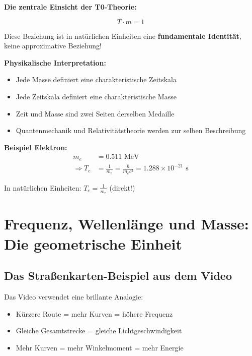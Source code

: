 \documentclass[12pt,a4paper]{article}
\begin{document}
	\begin{vorteil}
		\textbf{Die zentrale Einsicht der T0-Theorie:}
		
		\begin{equation}
			\boxed{T \cdot m = 1}
		\end{equation}
		
		Diese Beziehung ist in natürlichen Einheiten eine \textbf{fundamentale Identität}, keine approximative Beziehung!
		
		\textbf{Physikalische Interpretation:}
		\begin{itemize}
			\item Jede Masse definiert eine charakteristische Zeitskala
			\item Jede Zeitskala definiert eine charakteristische Masse
			\item Zeit und Masse sind zwei Seiten derselben Medaille
			\item Quantenmechanik und Relativitätstheorie werden zur selben Beschreibung
		\end{itemize}
		
		\textbf{Beispiel Elektron:}
		\begin{align}
			m_e &= 0.511 \text{ MeV} \\
			\Rightarrow T_e &= \frac{1}{m_e} = \frac{\hbar}{m_e c^2} = 1.288 \times 10^{-21} \text{ s}
		\end{align}
		
		In natürlichen Einheiten: $T_e = \frac{1}{m_e}$ (direkt!)
	\end{vorteil}
	
	\section{Frequenz, Wellenlänge und Masse: Die geometrische Einheit}
	
	\subsection{Das Straßenkarten-Beispiel aus dem Video}
	
	Das Video verwendet eine brillante Analogie:
	\begin{itemize}
		\item Kürzere Route = mehr Kurven = höhere Frequenz
		\item Gleiche Gesamtstrecke = gleiche Lichtgeschwindigkeit
		\item Mehr Kurven = mehr Winkelmoment = mehr Energie
	\end{itemize}
	
\end{document}
